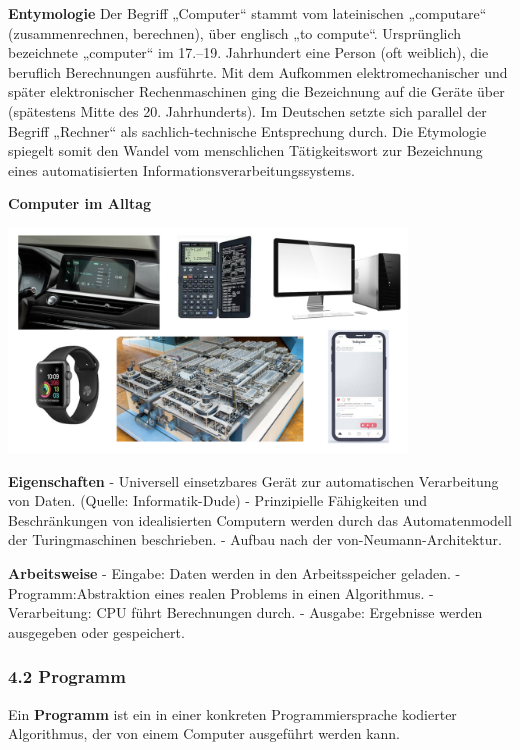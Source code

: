 \documentclass[
  11pt,
  a4paper,
  DIV=11,
  numbers=noendperiod]{scrartcl}
\begin{document}
\textbf{Entymologie} Der Begriff „Computer`` stammt vom lateinischen
„computare`` (zusammenrechnen, berechnen), über englisch „to compute``.
Ursprünglich bezeichnete „computer`` im 17.--19. Jahrhundert eine Person
(oft weiblich), die beruflich Berechnungen ausführte. Mit dem Aufkommen
elektromechanischer und später elektronischer Rechenmaschinen ging die
Bezeichnung auf die Geräte über (spätestens Mitte des 20. Jahrhunderts).
Im Deutschen setzte sich parallel der Begriff „Rechner`` als
sachlich-technische Entsprechung durch. Die Etymologie spiegelt somit
den Wandel vom menschlichen Tätigkeitswort zur Bezeichnung eines
automatisierten Informationsverarbeitungssystems.

\textbf{Computer im Alltag}

\includegraphics[width=4.16667in,height=\textheight,keepaspectratio]{images/computer.001.jpeg}

\textbf{Eigenschaften} - Universell einsetzbares Gerät zur automatischen
Verarbeitung von Daten. (Quelle: Informatik-Dude) - Prinzipielle
Fähigkeiten und Beschränkungen von idealisierten Computern werden durch
das Automatenmodell der Turingmaschinen beschrieben. - Aufbau nach der
von-Neumann-Architektur.

\textbf{Arbeitsweise} - Eingabe: Daten werden in den Arbeitsspeicher
geladen. - Programm:Abstraktion eines realen Problems in einen
Algorithmus. - Verarbeitung: CPU führt Berechnungen durch. - Ausgabe:
Ergebnisse werden ausgegeben oder gespeichert.

\subsubsection{4.2 Programm}\label{programm}

\begin{tcolorbox}[enhanced jigsaw, breakable, coltitle=black, colbacktitle=quarto-callout-note-color!10!white, colback=white, arc=.35mm, colframe=quarto-callout-note-color-frame, titlerule=0mm, leftrule=.75mm, title=\textcolor{quarto-callout-note-color}{\faInfo}\hspace{0.5em}{Definition}, toprule=.15mm, bottomtitle=1mm, rightrule=.15mm, bottomrule=.15mm, toptitle=1mm, opacityback=0, left=2mm, opacitybacktitle=0.6]

Ein \textbf{Programm} ist ein in einer konkreten Programmiersprache
kodierter Algorithmus, der von einem Computer ausgeführt werden kann.

\end{tcolorbox}
\end{document}
